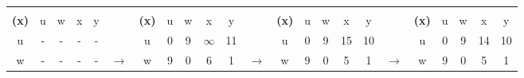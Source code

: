 \documentclass{article}
\begin{document}
\begin{latin}
\begin{table}[H]
\begin{tabular}{ccccccccccccccccccccccc}
                                   &                        &                        &                        &                        &                                        &                                   &                        &                        &                        &                        &                                        &                                   &                        &                        &                        &                        &                                        &                                   &                        &                        &                        &                        \\ \cline{1-5} \cline{7-11} \cline{13-17} \cline{19-23} 
\multicolumn{1}{|c|}{\textbf{(x)}} & \multicolumn{1}{c|}{u} & \multicolumn{1}{c|}{w} & \multicolumn{1}{c|}{x} & \multicolumn{1}{c|}{y} & \multicolumn{1}{c|}{}                  & \multicolumn{1}{c|}{\textbf{(x)}} & \multicolumn{1}{c|}{u} & \multicolumn{1}{c|}{w} & \multicolumn{1}{c|}{x} & \multicolumn{1}{c|}{y} & \multicolumn{1}{c|}{}                  & \multicolumn{1}{c|}{\textbf{(x)}} & \multicolumn{1}{c|}{u} & \multicolumn{1}{c|}{w} & \multicolumn{1}{c|}{x} & \multicolumn{1}{c|}{y} & \multicolumn{1}{c|}{}                  & \multicolumn{1}{c|}{\textbf{(x)}} & \multicolumn{1}{c|}{u} & \multicolumn{1}{c|}{w} & \multicolumn{1}{c|}{x} & \multicolumn{1}{c|}{y} \\ \cline{1-5} \cline{7-11} \cline{13-17} \cline{19-23} 
\multicolumn{1}{|c|}{u}            & -                      & -                      & -                      & -                      & \multicolumn{1}{c|}{}                  & \multicolumn{1}{c|}{u}            & 0                      & 9                      & $\infty$               & 11                     & \multicolumn{1}{c|}{}                  & \multicolumn{1}{c|}{u}            & 0                      & 9                      & 15                     & 10                     & \multicolumn{1}{c|}{}                  & \multicolumn{1}{c|}{u}            & 0                      & 9                      & 14                     & 10                     \\ \cline{1-1} \cline{7-7} \cline{13-13} \cline{19-19}
\multicolumn{1}{|c|}{w}            & -                      & -                      & -                      & -                      & \multicolumn{1}{c|}{$\longrightarrow$} & \multicolumn{1}{c|}{w}            & 9                      & 0                      & 6                      & 1                      & \multicolumn{1}{c|}{$\longrightarrow$} & \multicolumn{1}{c|}{w}            & 9                      & 0                      & 5                      & 1                      & \multicolumn{1}{c|}{$\longrightarrow$} & \multicolumn{1}{c|}{w}            & 9                      & 0                      & 5                      & 1                      \\ \cline{1-1} \cline{7-7} \cline{13-13} \cline{19-19}

\end{tabular}
\end{table}
\end{latin}
\end{document}
